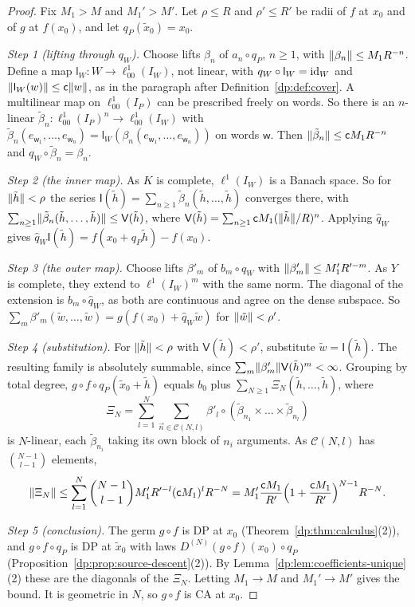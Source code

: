 \begin{proof}
Fix $M_1>M$ and $M_1'>M'$. Let $\rho\le R$ and $\rho'\le R'$ be radii of $f$ at $x_0$ and of $g$ at $f(x_0)$, and let $q_P(\tilde x_0)=x_0$.

\emph{Step 1 (lifting through $q_W$).} Choose lifts $\beta_n$ of $a_n\circ q_P$, $n\ge1$, with $\lVert \beta_n\rVert\le M_1R^{-n}$. Define a map $\mathsf l_W\colon W\to\ell^1_{00}(I_W)$, not linear, with $q_W\circ\mathsf l_W=\mathrm{id}_W$ and $\lVert \mathsf l_W(w)\rVert\le\mathsf c\lVert w\rVert$, as in the paragraph after Definition~\ref{dp:def:cover}. A multilinear map on $\ell^1_{00}(I_P)$ can be prescribed freely on words. So there is an $n$-linear $\tilde\beta_n\colon\ell^1_{00}(I_P)^n\to\ell^1_{00}(I_W)$ with $\tilde\beta_n(e_{\mathsf w_1},\dots,e_{\mathsf w_n})=\mathsf l_W(\beta_n(e_{\mathsf w_1},\dots,e_{\mathsf w_n}))$ on words $\mathsf w$. Then $\lVert \tilde\beta_n\rVert\le\mathsf cM_1R^{-n}$ and $q_W\circ\tilde\beta_n=\beta_n$.

\emph{Step 2 (the inner map).} As $K$ is complete, $\ell^1(I_W)$ is a Banach space. So for $\lVert \tilde h\rVert<\rho$ the series $\mathsf I(\tilde h)=\sum_{n\ge1}\tilde\beta_n(\tilde h,\dots,\tilde h)$ converges there, with $\sum_{n\ge1}\lVert \tilde\beta_n(\tilde h,\dots,\tilde h)\rVert\le\mathsf V(\tilde h)$, where $\mathsf V(\tilde h)=\sum_{n\ge1}\mathsf cM_1(\lVert \tilde h\rVert/R)^n$. Applying $\hat q_W$ gives $\hat q_W\mathsf I(\tilde h)=f(x_0+q_P\tilde h)-f(x_0)$.

\emph{Step 3 (the outer map).} Choose lifts $\beta'_m$ of $b_m\circ q_W$ with $\lVert \beta'_m\rVert\le M_1'R'^{-m}$. As $Y$ is complete, they extend to $\ell^1(I_W)^m$ with the same norm. The diagonal of the extension is $b_m\circ\hat q_W$, as both are continuous and agree on the dense subspace. So $\sum_m\beta'_m(\tilde w,\dots,\tilde w)=g(f(x_0)+\hat q_W\tilde w)$ for $\lVert \tilde w\rVert<\rho'$.

\emph{Step 4 (substitution).} For $\lVert \tilde h\rVert<\rho$ with $\mathsf V(\tilde h)<\rho'$, substitute $\tilde w=\mathsf I(\tilde h)$. The resulting family is absolutely summable, since $\sum_m\lVert \beta'_m\rVert\mathsf V(\tilde h)^m<\infty$. Grouping by total degree, $g\circ f\circ q_P(\tilde x_0+\tilde h)$ equals $b_0$ plus $\sum_{N\ge1}\Xi_N(\tilde h,\dots,\tilde h)$, where
\[
 \Xi_N=\sum_{l=1}^N\sum_{\vec n\in\mathcal C(N,l)}\beta'_l\circ(\tilde\beta_{n_1}\times\dots\times\tilde\beta_{n_l})
\]
is $N$-linear, each $\tilde\beta_{n_i}$ taking its own block of $n_i$ arguments. As $\mathcal C(N,l)$ has $\binom{N-1}{l-1}$ elements,
\[
 \lVert \Xi_N\rVert\le\sum_{l=1}^N\binom{N-1}{l-1}M_1'R'^{-l}(\mathsf cM_1)^lR^{-N}=M_1'\frac{\mathsf cM_1}{R'}\Bigl(1+\frac{\mathsf cM_1}{R'}\Bigr)^{N-1}R^{-N}.
\]

\emph{Step 5 (conclusion).} The germ $g\circ f$ is DP at $x_0$ (Theorem~\ref{dp:thm:calculus}(2)), and $g\circ f\circ q_P$ is DP at $\tilde x_0$ with laws $D^{(N)}(g\circ f)(x_0)\circ q_P$ (Proposition~\ref{dp:prop:source-descent}(2)). By Lemma~\ref{dp:lem:coefficients-unique}(2) these are the diagonals of the $\Xi_N$. Letting $M_1\to M$ and $M_1'\to M'$ gives the bound. It is geometric in $N$, so $g\circ f$ is CA at $x_0$.
\end{proof}

